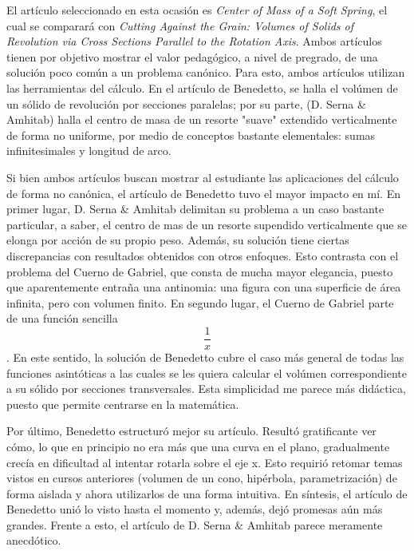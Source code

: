 El artículo seleccionado en esta ocasión es \emph{Center of Mass of a
Soft Spring}, el cual se comparará con \emph{Cutting Against the Grain:
Volumes of Solids of Revolution via Cross Sections Parallel to the
Rotation Axis}. Ambos artículos tienen por objetivo mostrar el valor
pedagógico, a nivel de pregrado, de una solución poco común a un
problema canónico. Para esto, ambos artículos utilizan las herramientas
del cálculo. En el artículo de Benedetto, se halla el volúmen de un
sólido de revolución por secciones paralelas; por su parte, (D. Serna \&
Amhitab) halla el centro de masa de un resorte "suave" extendido
verticalmente de forma no uniforme, por medio de conceptos bastante
elementales: sumas infinitesimales y longitud de arco.

Si bien ambos artículos buscan mostrar al estudiante las aplicaciones
del cálculo de forma no canónica, el artículo de Benedetto tuvo el mayor
impacto en mí. En primer lugar, D. Serna \& Amhitab delimitan su
problema a un caso bastante particular, a saber, el centro de mas de un
resorte supendido verticalmente que se elonga por acción de su propio
peso. Además, su solución tiene ciertas discrepancias con resultados
obtenidos con otros enfoques. Esto contrasta con el problema del Cuerno
de Gabriel, que consta de mucha mayor elegancia, puesto que
aparentemente entraña una antinomia: una figura con una superficie de
área infinita, pero con volumen finito. En segundo lugar, el Cuerno de
Gabriel parte de una función sencilla \[\frac{1}{x}\]. En este sentido,
la solución de Benedetto cubre el caso más general de todas las
funciones asintóticas a las cuales se les quiera calcular el volúmen
correspondiente a su sólido por secciones transversales. Esta
simplicidad me parece más didáctica, puesto que permite centrarse en la
matemática.

Por último, Benedetto estructuró mejor su artículo. Resultó gratificante
ver cómo, lo que en principio no era más que una curva en el plano,
gradualmente crecía en dificultad al intentar rotarla sobre el eje x.
Esto requirió retomar temas vistos en cursos anteriores (volumen de un
cono, hipérbola, parametrización) de forma aislada y ahora utilizarlos
de una forma intuitiva. En síntesis, el artículo de Benedetto unió lo
visto hasta el momento y, además, dejó promesas aún más grandes. Frente
a esto, el artículo de D. Serna \& Amhitab parece meramente anecdótico.
